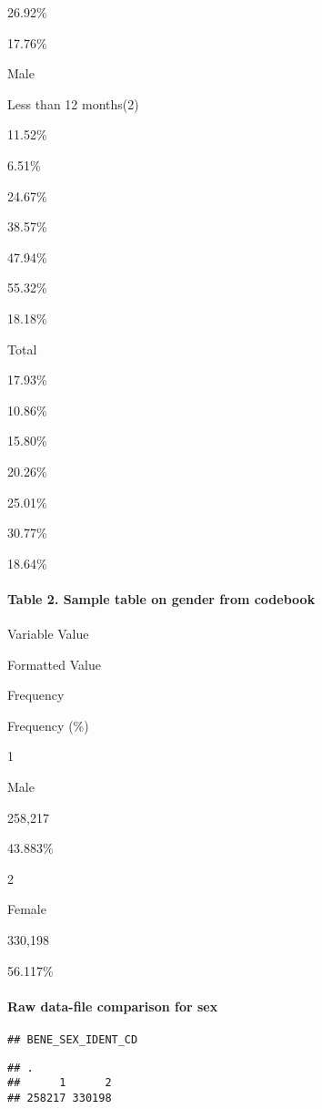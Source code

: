 \documentclass[]{article}
\let\oldparagraph\paragraph
\renewcommand{\paragraph}[1]{\oldparagraph{#1}\mbox{}}
\begin{document}
26.92\%

17.76\%

Male

Less than 12 months(2)

11.52\%

6.51\%

24.67\%

38.57\%

47.94\%

55.32\%

18.18\%

Total

17.93\%

10.86\%

15.80\%

20.26\%

25.01\%

30.77\%

18.64\%

\hypertarget{table-2.-sample-table-on-gender-from-codebook}{%
\paragraph{Table 2. Sample table on gender from
codebook}\label{table-2.-sample-table-on-gender-from-codebook}}

Variable Value

Formatted Value

Frequency

Frequency (\%)

1

Male

258,217

43.883\%

2

Female

330,198

56.117\%

\hypertarget{raw-data-file-comparison-for-sex}{%
\paragraph{Raw data-file comparison for
sex}\label{raw-data-file-comparison-for-sex}}

\begin{verbatim}
## BENE_SEX_IDENT_CD
\end{verbatim}

\begin{verbatim}
## .
##      1      2 
## 258217 330198
\end{verbatim}
\end{document}
